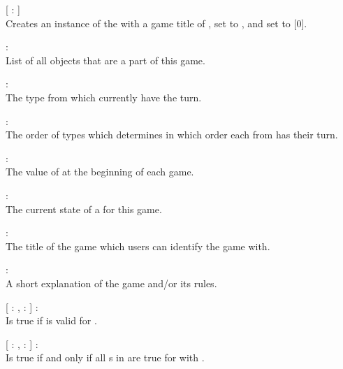 \begin{dlist}
  \item {}[ : ]\\
  Creates an instance of the  with a game title of
  ,  set to , and
   set to [0].
  
  \item {} : \\
  List of all  objects that are a part of this game.
  
  \item {} : \\
  The  type from  which currently have the turn.
  
  \item {} : \\
  The order of  types which determines in which order each
   from  has their turn.
  
  \item {} : \\
  The value of  at the beginning of each game.
  
  \item {} : \\
  The current state of a  for this game.
  
  \item {} : \\
  The title of the game which users can identify the game with.
  
  \item {} : \\
  A short explanation of the game and/or its rules.
  
  \item {}[  : ,  :  ] : \\
  Is true if  is valid for .
  
  \item {}[  : ,  :  ] : \\
  Is true if and only if all s in  are true
  for  with .
  

\end{dlist}
